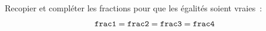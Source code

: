 \documentclass[exercice]{thedocument}%
\begin{document}
%
Recopier et compléter les fractions pour que les égalités soient vraies~:
$$\<frac1;=\<frac2;=\<frac3;=\<frac4;$$
\end{document}
